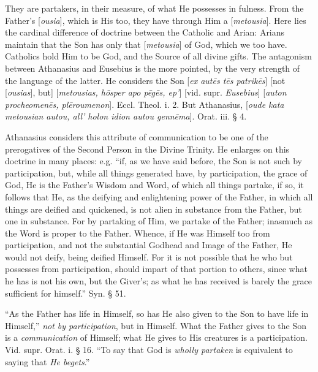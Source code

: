 They are partakers, in their measure, of what He
possesses in fulness. From the Father's [\emph{ousia}], which is His
too, they have through Him a [\emph{metousia}]. Here lies the cardinal
difference of doctrine between the Catholic and Arian: Arians maintain
that the Son has only that [\emph{metousia}] of God, which we too
have. Catholics hold Him to be God, and the Source of all divine
gifts. The antagonism between Athanasius and Eusebius is the more
pointed, by the very strength of the language of the latter. He
considers the Son [\emph{ex aut\={e}s t\={e}s patrik\={e}s}]
[not [\emph{ousias}], but] [\emph{metousias, h\={o}sper apo p\={e}g\={e}s,
ep'}] [vid.
supr. \emph{Eusebius}] [\emph{auton procheomen\={e}s, pl\={e}roumenon}].
Eccl. Theol. i. 2. But Athanasius, [\emph{oude kata metousian autou, all'
holon idion autou genn\={e}ma}]. Orat. iii. § 4.

Athanasius considers this attribute of
communication to be one of the prerogatives of the Second Person in
the Divine Trinity. He enlarges on this doctrine in many places:
e.g. ``if, as we have said before, the Son is not such by
participation, but, while all things generated have, by participation,
the grace of God, He is the Father's Wisdom and Word, of which all
things partake, if so, it follows that He, as the deifying and
enlightening power of the Father, in which all things are deified and
quickened, is not alien in substance from the Father, but one in
substance. For by partaking of Him, we partake of the Father; inasmuch
as the Word is proper to the Father. Whence, if He was Himself too
from participation, and not the substantial Godhead and Image of the
Father, He would not deify, being deified Himself. For it is not
possible that he who but possesses from participation, should impart
of that portion to others, since what he has is not his own, but the
Giver's; as what he has received is barely the grace sufficient for
himself.'' Syn. § 51.

``As the Father has life in Himself, so has He
also given to the Son to have life in Himself,'' \emph{not by
participation}, but in Himself. What the Father gives to the Son is
a \emph{communication} of Himself; what He gives to His creatures is a
participation. Vid. supr. Orat. i. § 16. ``To say that God is \emph{wholly
partaken} is equivalent to saying that \emph{He begets}.''


